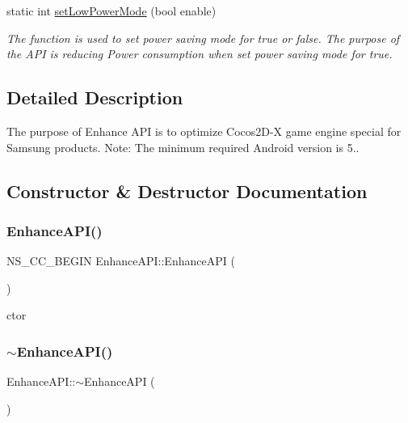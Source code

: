 \begin{DoxyCompactItemize}
static int \hyperlink{classEnhanceAPI_a96c78fe2277b1c0d4fe03cce4adf1a16}{set\+Low\+Power\+Mode} (bool enable)
\begin{DoxyCompactList}\small\item\em The function is used to set power saving mode for true or false. The purpose of the A\+PI is reducing Power consumption when set power saving mode for true. \end{DoxyCompactList}\end{DoxyCompactItemize}


\subsection{Detailed Description}
The purpose of Enhance A\+PI is to optimize Cocos2\+D-\/X game engine special for Samsung products. Note\+: The minimum required Android version is 5.. 

\subsection{Constructor \& Destructor Documentation}
\mbox{\label{classEnhanceAPI_a38b0ef3cef705185a13174655fa62306}} 
\subsubsection{\texorpdfstring{Enhance\+A\+P\+I()}{EnhanceAPI()}\hspace{0.1cm}{\footnotesize\ttfamily [1/2]}}
{\footnotesize\ttfamily N\+S\+\_\+\+C\+C\+\_\+\+B\+E\+G\+IN Enhance\+A\+P\+I\+::\+Enhance\+A\+PI (\begin{DoxyParamCaption}{ }\end{DoxyParamCaption})}

ctor \mbox{\label{classEnhanceAPI_a50fcd2ce419536d19d01b6b9728cae67}} 
\subsubsection{\texorpdfstring{$\sim$\+Enhance\+A\+P\+I()}{~EnhanceAPI()}\hspace{0.1cm}{\footnotesize\ttfamily [1/2]}}
{\footnotesize\ttfamily Enhance\+A\+P\+I\+::$\sim$\+Enhance\+A\+PI (\begin{DoxyParamCaption}{ }\end{DoxyParamCaption})\hspace{0.3cm}{\ttfamily [virtual]}}

